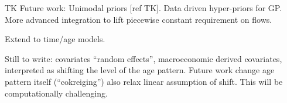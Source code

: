 TK Future work: Unimodal priors [ref TK].  Data driven hyper-priors
for GP.  More advanced integration to lift piecewise constant
requirement on flows.

Extend to time/age models.

Still to write: covariates ``random effects'', macroeconomic derived
covariates, interpreted as shifting the level of the age pattern.
Future work change age pattern itself (``cokreiging'') also relax
linear assumption of shift.  This will be computationally challenging.


